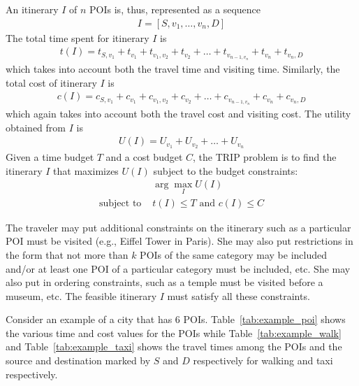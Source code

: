 An itinerary $I$ of $n$ POIs is, thus, represented as a sequence
%
\begin{align}
	I = [ S, v_1, \dots, v_n, D ]
\end{align}
%
The total time spent for itinerary $I$ is
%
\begin{align}
	t(I) = t_{S,v_1} + t_{v_1} + t_{v_1,v_2} + t_{v_2} + \dots + t_{v_{n-1,v_n}} + t_{v_n} + t_{v_n,D}
\end{align}
%
which takes into account both the travel time and visiting time.  Similarly,
the total cost of itinerary $I$ is 
%
\begin{align}
	c(I) = c_{S,v_1} + c_{v_1} + c_{v_1,v_2} + c_{v_2} + \dots + c_{v_{n-1,v_n}} + c_{v_n} + c_{v_n,D}
\end{align}
%
which again takes into account both the travel cost and visiting cost.  The
utility obtained from $I$ is
%
\begin{align}
	U(I) = U_{v_1} + U_{v_2} + \dots + U_{v_n}
\end{align}
%
Given a time budget $T$ and a cost budget $C$, the TRIP problem is to find the
itinerary $I$ that maximizes $U(I)$ subject to the budget constraints:
%
\begin{align}
	& \arg\max_I U(I) \\
	\text{subject to } & t(I) \leq T \text{ and } c(I) \leq C
\end{align}

The traveler may put additional constraints on the itinerary such as
a particular POI must be visited (e.g., Eiffel Tower in Paris).  She
may also put restrictions in the form that not more than $k$ POIs of
the same category may be included and/or at least one POI of a particular
category must be included, etc.  She may also put in ordering
constraints, such as a temple must be visited before a museum, etc.  The feasible itinerary $I$ must satisfy all these
constraints.

Consider an example of a city that has 6 POIs.
Table~\ref{tab:example_poi} shows the various time and cost values for
the POIs while Table~\ref{tab:example_walk} and
Table~\ref{tab:example_taxi} shows the travel times among the POIs and
the source and destination marked by $S$ and $D$ respectively for
walking and taxi respectively.

